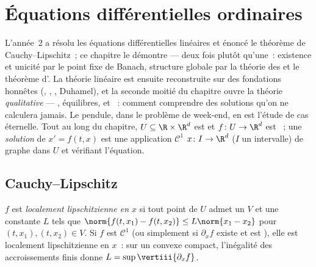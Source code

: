 \chapter{Équations différentielles ordinaires}\label{ch:b3:ode}

L'année~2 a résolu les équations différentielles linéaires et
énoncé le théorème de Cauchy--Lipschitz~; ce chapitre le
démontre --- deux fois plutôt qu'une~: existence et unicité par
le point fixe de Banach, structure globale par la théorie des
 et le théorème d'. La théorie linéaire est ensuite reconstruite sur des
fondations honnêtes (, , , Duhamel), et la seconde moitié du chapitre ouvre la
théorie \emph{qualitative} --- , équilibres,  et ~: comment comprendre des
solutions qu'on ne calculera jamais. Le pendule, dans le
problème de week-end, en est l'étude de cas éternelle. Tout au
long du chapitre, $U \subseteq \R\times\R^d$ est  et
$f \colon U \to \R^d$ est ~; une \emph{solution} de
$x' = f(t, x)$ est une application $\mathcal C^1$
$x \colon I \to \R^d$ ($I$ un intervalle) de graphe 
dans $U$ et vérifiant l'équation.

\section{Cauchy--Lipschitz}

\begin{definition}\label{def:b3:ode:lipschitz}
$f$ est \emph{localement lipschitzienne en $x$}
si tout point de $U$ admet un  $V$ et une constante
$L$ tels que $\norm{f(t, x_1) - f(t, x_2)} \leq L\norm{x_1 -
x_2}$ pour $(t, x_1), (t, x_2) \in V$. Si $f$ est $\mathcal
C^1$ (ou simplement si $\partial_xf$ existe et est ),
elle est localement lipschitzienne en $x$~: sur un 
convexe compact, l'inégalité des accroissements finis donne
$L = \sup\vertiii{\partial_xf}$.
\end{definition}


